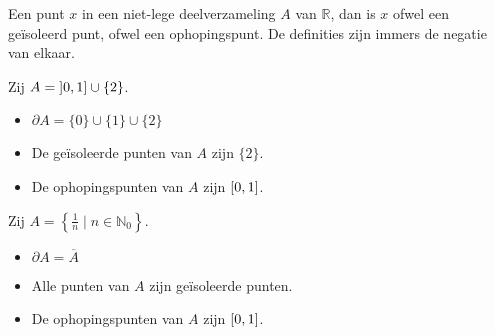 \documentclass[main.tex]{subfiles}
\begin{document}
\begin{opm}
  Een punt $x$ in een niet-lege deelverzameling $A$ van $\mathbb{R}$, dan is $x$ ofwel een ge\"isoleerd punt, ofwel een ophopingspunt.
  De definities zijn immers de negatie van elkaar.
\end{opm}

\begin{vb}
  Zij $A= \interval[open left]{0}{1} \cup \{2\}$.
  \begin{itemize}
  \item $\partial{A} = \{0\} \cup \{1\} \cup \{2\}$
  \item De ge\"isoleerde punten van $A$ zijn $\{2\}$.
  \item De ophopingspunten van $A$ zijn $\interval{0}{1}$.
  \end{itemize}
\end{vb}

\begin{vb}
  Zij $A= \left\{ \frac{1}{n} \mid n\in \mathbb{N}_{0} \right\}$.
  \begin{itemize}
  \item $\partial{A} = \overline{A}$
  \item Alle punten van $A$ zijn ge\"isoleerde punten.
  \item De ophopingspunten van $A$ zijn $\interval{0}{1}$.
  \end{itemize}
\end{vb}
\end{document}
